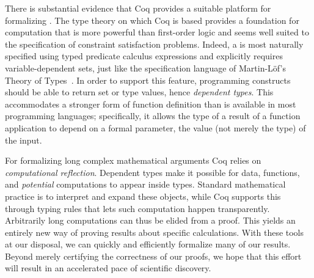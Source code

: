 There is substantial evidence that Coq provides a suitable platform for
formalizing \csp.  The type theory on which Coq is based provides
a foundation for computation that is more powerful than
first-order logic and seems well suited to the specification of
constraint satisfaction problems.
Indeed, a \csp is most naturally specified using typed predicate calculus
expressions and explicitly requires variable-dependent sets,
just like the specification language of Martin-L\"{o}f's 
Theory of Types~\cite{MR769301}.
In order to support this feature, programming constructs should be
able to return set or type values, hence \emph{dependent types}. 
This accommodates a stronger form of function definition than is available in
most programming languages; specifically, it allows the type of a result of a
function application to depend on a formal parameter, the value (not merely the
type) of the input.

For formalizing long complex mathematical arguments Coq 
relies on \emph{computational reflection}.
Dependent types make it possible for data, functions, and \emph{potential}
computations to appear inside types. Standard mathematical practice is
to interpret and expand these objects, 
while Coq supports this through typing rules that lets such computation happen 
transparently. 
Arbitrarily long computations can thus
be elided from a proof. %
This yields an entirely new way of proving
results about specific calculations.
With these tools at our disposal, we can quickly and efficiently formalize many
of our results.  Beyond merely certifying the correctness of our proofs, we hope
that this effort will result in an accelerated pace of scientific discovery.

